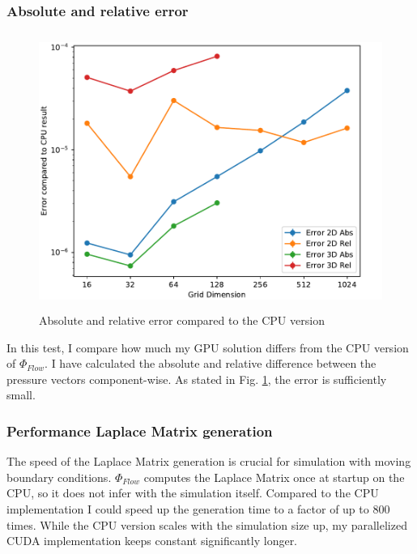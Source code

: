 \subsubsection{Absolute and relative error}
\begin{figure}[t]
\centering
	\includegraphics[height=9cm, width=14cm]{figures/error}
\caption{Absolute and relative error compared to the CPU version} \label{fig:error}
\end{figure}
In this test, I compare how much my GPU solution differs from the CPU version of $\Phi_{Flow}$. I have calculated the absolute and relative difference between the pressure vectors component-wise. As stated in Fig. \ref{fig:error}, the error is sufficiently small.

\clearpage
\subsubsection{Performance Laplace Matrix generation}
The speed of the Laplace Matrix generation is crucial for simulation with moving boundary conditions. $\Phi_{Flow}$ computes the Laplace Matrix once at startup on the CPU, so it does not infer with the simulation itself. Compared to the CPU implementation I could speed up the generation time to a factor of up to 800 times. While the CPU version scales with the simulation size up, my parallelized CUDA implementation keeps constant significantly longer.


